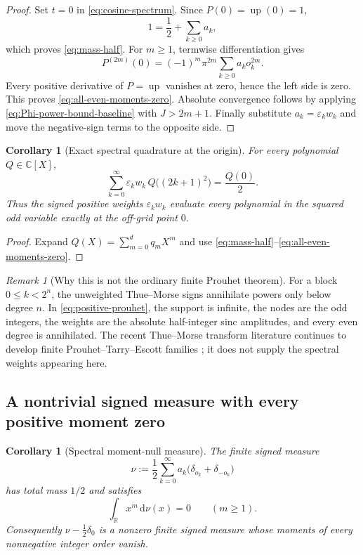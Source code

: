 \documentclass[11pt,oneside]{article}
\newtheorem{corollary}[theorem]{Corollary}
\theoremstyle{definition}
\theoremstyle{remark}
\newtheorem{remark}[theorem]{Remark}
\newcommand{\R}{\mathbb R}
\newcommand{\C}{\mathbb C}
\newcommand{\Up}{\operatorname{up}}
\newcommand{\dd}{\,\mathrm d}
\newcommand{\eps}{\varepsilon}
\begin{document}
\begin{proof}
Set $t=0$ in \eqref{eq:cosine-spectrum}.  Since $P(0)=\Up(0)=1$,
\[
 1=\frac12+\sum_{k\ge0}a_k,
\]
which proves \eqref{eq:mass-half}.  For $m\ge1$, termwise differentiation gives
\[
 P^{(2m)}(0)=(-1)^m\pi^{2m}
 \sum_{k\ge0}a_ko_k^{2m}.
\]
Every positive derivative of $P=\Up$ vanishes at zero, hence the left side is
zero.  This proves \eqref{eq:all-even-moments-zero}.  Absolute convergence
follows by applying \eqref{eq:Phi-power-bound-baseline} with $J>2m+1$.
Finally substitute $a_k=\eps_kw_k$ and move the negative-sign terms to the
opposite side.
\end{proof}

\begin{corollary}[Exact spectral quadrature at the origin]\label{cor:spectral-quadrature}
For every polynomial $Q\in\C[X]$,
\begin{equation}\label{eq:polynomial-quadrature}
 \boxed{
 \sum_{k=0}^{\infty}\eps_kw_k\,Q\bigl((2k+1)^2\bigr)
 =\frac{Q(0)}2.}
\end{equation}
Thus the signed positive weights $\eps_kw_k$ evaluate every polynomial in the
squared odd variable exactly at the off-grid point $0$.
\end{corollary}

\begin{proof}
Expand $Q(X)=\sum_{m=0}^d q_mX^m$ and use
\eqref{eq:mass-half}--\eqref{eq:all-even-moments-zero}.
\end{proof}

\begin{remark}[Why this is not the ordinary finite Prouhet theorem]
For a block $0\le k<2^n$, the unweighted Thue--Morse signs annihilate powers
only below degree $n$.  In \eqref{eq:positive-prouhet}, the support is infinite,
the nodes are the odd integers, the weights are the absolute half-integer sinc
amplitudes, and every even degree is annihilated.  The recent Thue--Morse
transform literature continues to develop finite Prouhet--Tarry--Escott
families \cite{cloitre2026}; it does not supply the spectral weights appearing
here.
\end{remark}

\subsection{A nontrivial signed measure with every positive moment zero}

\begin{corollary}[Spectral moment-null measure]\label{cor:moment-null-measure}
The finite signed measure
\begin{equation}\label{eq:nu-measure}
 \nu:=\frac12\sum_{k=0}^{\infty}a_k
 \bigl(\delta_{o_k}+\delta_{-o_k}\bigr)
\end{equation}
has total mass $1/2$ and satisfies
\begin{equation}\label{eq:nu-moments}
 \int_{\R}x^m\dd\nu(x)=0\qquad(m\ge1).
\end{equation}
Consequently $\nu-\tfrac12\delta_0$ is a nonzero finite signed measure whose
moments of every nonnegative integer order vanish.
\end{corollary}
\end{document}
